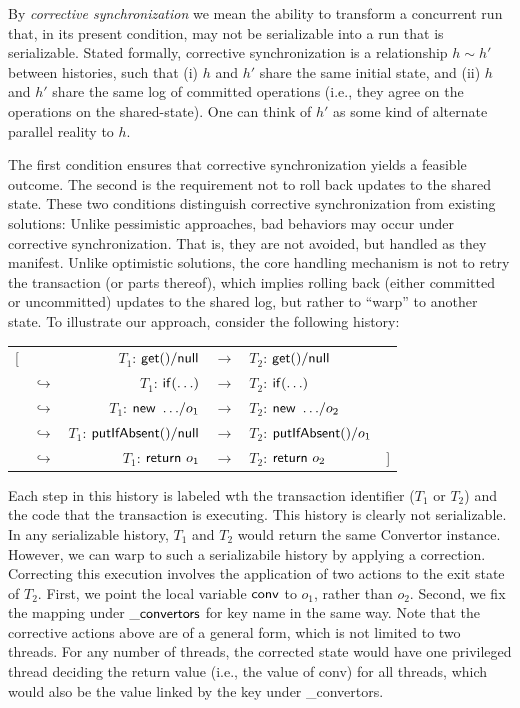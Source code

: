 
\newcommand\hrel{\sim}
%
By \emph{corrective synchronization} we mean the ability to transform a concurrent run that, in its present condition, may not be serializable into a run that is serializable. Stated formally, corrective synchronization is a relationship $h \hrel h'$ between histories, such that (i) $h$ and $h'$ share the same initial state, and (ii) $h$ and $h'$ share the same log of committed operations (i.e., they agree on the operations on the shared-state). One can think of $h'$ as some kind of alternate parallel reality to $h$.

The first condition ensures that corrective synchronization yields a feasible outcome. The second is the requirement not to roll back updates to the shared state. These two conditions distinguish corrective synchronization from existing solutions: Unlike pessimistic approaches, bad behaviors may occur under corrective synchronization. That is, they are not avoided, but handled as they manifest. Unlike optimistic solutions, the core handling mechanism is not to retry the transaction (or parts thereof), which implies rolling back (either committed or uncommitted) updates to the shared log, but rather to ``warp'' to another state.
%
To illustrate our approach, consider the following  history: %
	\begin{center}
		\begin{tabular}{r@{}lrcl@{}l}
			[ & & $T_1$: ${\sf get()}/{\sf null}$ & $\rightarrow$ & $T_2$: ${\sf get()}/{\sf null}$  & \\
			& $\hookrightarrow$ & $T_1$: ${\sf if(\ldots)}$ & $\rightarrow$  & $T_2$: ${\sf if(\ldots)}$ & \\ 
			& $\hookrightarrow$ & $T_1$: ${\sf new\ \ldots}/o_1$ & $\rightarrow$ & $T_2$: ${\sf new\ \ldots}/o_2$ & \\ 
			& $\hookrightarrow$ & $T_1$: ${\sf putIfAbsent()}/{\sf null}$ & $\rightarrow$ & $T_2$: ${\sf putIfAbsent()}/o_1$  & \\ 
			& $\hookrightarrow$ & $T_1$: ${\sf return}\ o_1$ & $\rightarrow$ & $T_2$: ${\sf return}\ o_2$ & ]
		\end{tabular}
	\end{center}
Each step in this history is labeled wth the transaction identifier ($T_1$ or $T_2$) and the code that the transaction is executing.
This history is clearly not serializable. In any serializable history, $T_1$ and $T_2$ would return the same {\sf Convertor} instance. However, we can warp to such a serializabile history by applying a correction.
%
Correcting this execution involves the application of two actions to the exit state of $T_2$. First, we point the local variable ${\sf conv}$ to $o_1$, rather than $o_2$. Second, we fix the mapping under ${\sf \_convertors}$ for key {\sf name} in the same way.
%
Note that the corrective actions above are of a general form, which is not limited to two threads. For any number of threads, the corrected state would have one privileged thread deciding the return value (i.e., the value of {\sf conv}) for all threads, which would also be the value linked by the key under {\sf \_convertors}.

